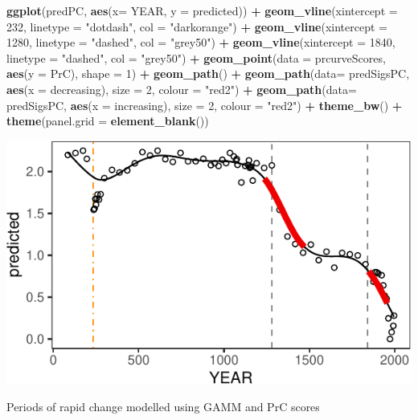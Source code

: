 \documentclass[nofonts,]{tufte-handout}
\newenvironment{Shaded}{\begin{snugshade}}{\end{snugshade}}
\newcommand{\AttributeTok}[1]{\textcolor[rgb]{0.13,0.29,0.53}{#1}}
\newcommand{\DecValTok}[1]{\textcolor[rgb]{0.00,0.00,0.81}{#1}}
\newcommand{\FunctionTok}[1]{\textcolor[rgb]{0.13,0.29,0.53}{\textbf{#1}}}
\newcommand{\NormalTok}[1]{#1}
\newcommand{\SpecialCharTok}[1]{\textcolor[rgb]{0.81,0.36,0.00}{\textbf{#1}}}
\newcommand{\StringTok}[1]{\textcolor[rgb]{0.31,0.60,0.02}{#1}}
\begin{document}
\begin{Shaded}
\begin{Highlighting}[]
\FunctionTok{ggplot}\NormalTok{(predPC, }\FunctionTok{aes}\NormalTok{(}\AttributeTok{x=}\NormalTok{ YEAR, }\AttributeTok{y =}\NormalTok{ predicted)) }\SpecialCharTok{+} 
  \FunctionTok{geom\_vline}\NormalTok{(}\AttributeTok{xintercept =} \DecValTok{232}\NormalTok{, }
             \AttributeTok{linetype =} \StringTok{"dotdash"}\NormalTok{,}
             \AttributeTok{col =} \StringTok{"darkorange"}\NormalTok{) }\SpecialCharTok{+}
    \FunctionTok{geom\_vline}\NormalTok{(}\AttributeTok{xintercept =} \DecValTok{1280}\NormalTok{, }
             \AttributeTok{linetype =} \StringTok{"dashed"}\NormalTok{,}
             \AttributeTok{col =} \StringTok{"grey50"}\NormalTok{) }\SpecialCharTok{+}
    \FunctionTok{geom\_vline}\NormalTok{(}\AttributeTok{xintercept =} \DecValTok{1840}\NormalTok{, }
             \AttributeTok{linetype =} \StringTok{"dashed"}\NormalTok{,}
             \AttributeTok{col =} \StringTok{"grey50"}\NormalTok{) }\SpecialCharTok{+}
  \FunctionTok{geom\_point}\NormalTok{(}\AttributeTok{data =}\NormalTok{ prcurveScores, }\FunctionTok{aes}\NormalTok{(}\AttributeTok{y =}\NormalTok{ PrC),}
             \AttributeTok{shape =} \DecValTok{1}\NormalTok{) }\SpecialCharTok{+}
  \FunctionTok{geom\_path}\NormalTok{() }\SpecialCharTok{+}
  \FunctionTok{geom\_path}\NormalTok{(}\AttributeTok{data=}\NormalTok{ predSigsPC, }\FunctionTok{aes}\NormalTok{(}\AttributeTok{x =}\NormalTok{ decreasing),}
            \AttributeTok{size =} \DecValTok{2}\NormalTok{, }\AttributeTok{colour =} \StringTok{"red2"}\NormalTok{) }\SpecialCharTok{+} 
  \FunctionTok{geom\_path}\NormalTok{(}\AttributeTok{data=}\NormalTok{ predSigsPC, }\FunctionTok{aes}\NormalTok{(}\AttributeTok{x =}\NormalTok{ increasing),}
            \AttributeTok{size =} \DecValTok{2}\NormalTok{, }\AttributeTok{colour =} \StringTok{"red2"}\NormalTok{) }\SpecialCharTok{+} 
  \FunctionTok{theme\_bw}\NormalTok{() }\SpecialCharTok{+}
  \FunctionTok{theme}\NormalTok{(}\AttributeTok{panel.grid =} \FunctionTok{element\_blank}\NormalTok{())}
\end{Highlighting}
\end{Shaded}

\begin{marginfigure}
\includegraphics{Technical-supplement_files/figure-latex/gamRates-1} \caption[Periods of rapid change modelled using GAMM and PrC scores]{Periods of rapid change modelled using GAMM and PrC scores}\label{fig:gamRates}
\end{marginfigure}
\end{document}
